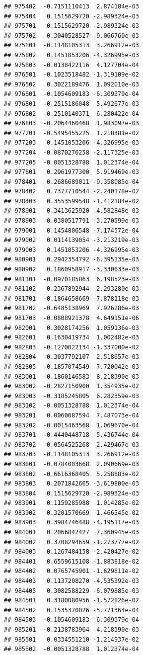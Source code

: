 \begin{frame}[fragile]
\begin{verbatim}
## 975402  -0.7151110413  2.874184e-03
## 975404   0.1515629720 -2.989324e-03
## 975701   0.1515629720 -2.989324e-03
## 975702   0.3040528527 -9.066760e-03
## 975801  -0.1148105313  3.266912e-03
## 975802   0.1451053206 -4.326995e-03
## 975803  -0.0138422116  4.127704e-04
## 976501  -0.1023518482 -1.319109e-02
## 976502   0.3022189476  1.092010e-03
## 976601  -0.1054609183 -6.309379e-04
## 976801  -0.2515186048  5.492677e-03
## 976802  -0.2510140371  6.280422e-04
## 976803  -0.2064460468  1.983097e-03
## 977201  -0.5495455225  1.218381e-02
## 977203   0.1451053206 -4.326995e-03
## 977204  -0.0870276258 -2.117325e-03
## 977205  -0.0051328788  1.012374e-04
## 977801   0.2961977300  5.919469e-03
## 978401   0.2686689011 -9.358085e-04
## 978402   0.7377710544 -2.240178e-02
## 978403   0.3553599548 -1.412184e-02
## 978901   0.3413625920 -4.582848e-03
## 978903   0.0380517791 -3.270599e-03
## 979001   0.1454806548 -7.174572e-04
## 979002   0.0114139054 -3.213219e-03
## 979003   0.1451053206 -4.326995e-03
## 980901   0.2942354792 -6.395135e-03
## 980902   0.1860958917 -3.330633e-03
## 981101  -0.0970185863  6.198523e-03
## 981102   0.2367892944  2.293280e-03
## 981701  -0.1864658669 -7.878118e-03
## 981702  -0.6485138969  7.926286e-03
## 981703  -0.0808921378  4.649151e-06
## 982001   0.3028174256  1.059136e-03
## 982601   0.1630419734  1.002482e-03
## 982803  -0.1270022134 -1.337000e-02
## 982804  -0.3037792107  2.518657e-03
## 982805  -0.1857074549 -7.720042e-03
## 983001  -0.1860146583  8.218390e-03
## 983002  -0.2827150900  1.354935e-02
## 983003  -0.3185245805  6.282359e-03
## 983102  -0.0051328788  1.012374e-04
## 983201   0.0060087594  7.487073e-04
## 983202  -0.0015463568  1.069670e-04
## 983701  -0.4440448718 -5.436744e-04
## 983702  -0.0564525268 -2.429467e-03
## 983703  -0.1148105313  3.266912e-03
## 983801  -0.0784003668  2.090669e-03
## 983802  -0.6616368405  5.258883e-02
## 983803   0.2071842665 -3.619800e-03
## 983804   0.1515629720 -2.989324e-03
## 983901   0.1159285988  1.014285e-02
## 983902   0.3201570669  1.466545e-02
## 983903   0.3984746488 -4.195117e-03
## 984001   0.2066842427  7.360945e-03
## 984002   0.3708294659 -1.273777e-02
## 984003   0.1267484158 -2.420427e-02
## 984401   0.6559615108 -1.883818e-02
## 984402   0.0765745901 -1.629811e-02
## 984403   0.1137208270 -4.535392e-03
## 984405   0.3082588229 -6.079885e-03
## 984501   0.3180080956 -1.572826e-02
## 984502   0.1535370026 -5.771364e-04
## 984503  -0.1054609183 -6.309379e-04
## 985201  -0.2138783964  4.218390e-03
## 985501   0.0334551210 -1.214937e-02
## 985502  -0.0051328788  1.012374e-04

\end{verbatim}
\end{frame}
